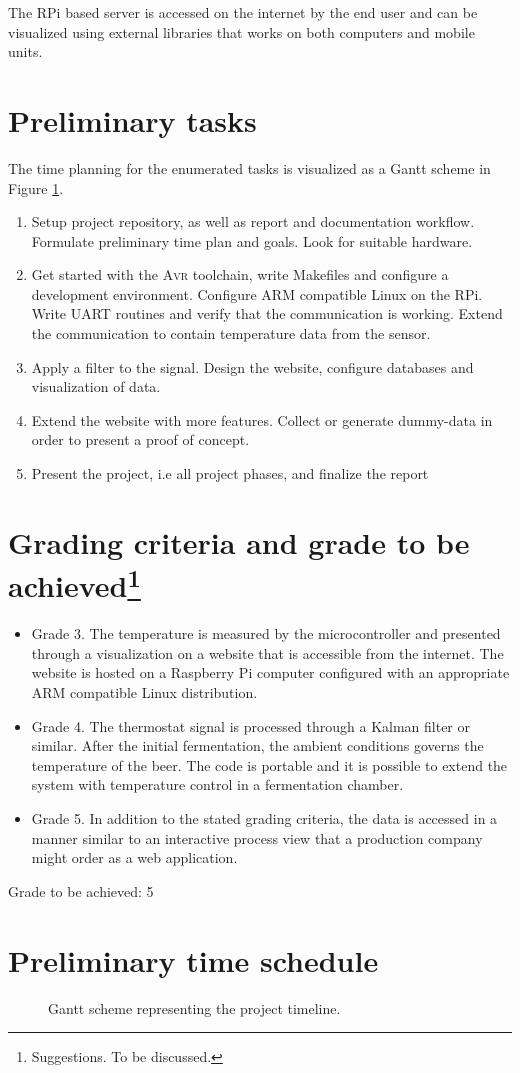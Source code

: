 \documentclass[10pt]{article}
\newcommand{\AVR}{\textsc{Avr}\xspace}
\begin{document}
The RPi based server is accessed on the internet by the end user and can be visualized using external libraries that works on both computers and mobile units.
\newpage
\section*{Preliminary tasks}%
\label{sec:preliminary_tasks}
The time planning for the enumerated tasks is visualized as a Gantt scheme in Figure \ref{fig:gantt}.
\begin{enumerate}
  \item
Setup project repository, as well as report and documentation workflow. Formulate preliminary time plan and goals. Look for suitable hardware.
  \item
Get started with the \AVR toolchain, write Makefiles and configure a development environment. Configure ARM compatible Linux on the RPi. Write UART routines and verify that the communication is working. Extend the communication to contain temperature data from the sensor.
  \item
    Apply a filter to the signal. Design the website, configure databases and visualization of data.
  \item
    Extend the website with more features. Collect or generate dummy-data in order to present a proof of concept.
  \item Present the project, i.e all project phases, and finalize the report
\end{enumerate}
\section*{Grading criteria and grade to be achieved\protect\footnote{Suggestions. To be discussed.}}%
\label{sec:grading_criteria_and_grading_goal}
\begin{itemize}
  \item 
    Grade 3. The temperature is measured by the microcontroller and presented through a visualization on a website that is accessible from the internet. The website is hosted on a Raspberry Pi computer configured with an appropriate ARM compatible Linux distribution.
  \item 
   Grade 4. The thermostat signal is processed through a Kalman filter or similar. After the initial fermentation, the ambient conditions governs the temperature of the beer. The code is portable and it is possible to extend the system with temperature control in a fermentation chamber.
  \item
   Grade 5. In addition to the stated grading criteria, the data is accessed in a manner similar to an interactive process view that a production company might order as a web application.
\end{itemize}

Grade to be achieved: 5
\newpage
\section*{Preliminary time schedule}%
\label{sec:preliminary_time_schedule}


\begin{figure}[ht]
  \centering
  
  \caption{Gantt scheme representing the project timeline.}
  \label{fig:gantt}
\end{figure}
\end{document}
